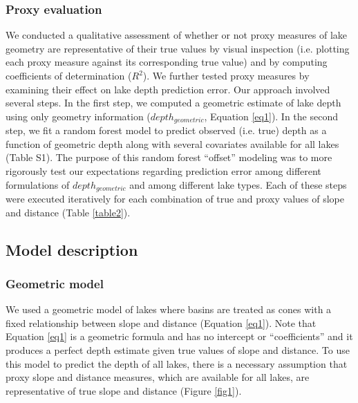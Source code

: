 \documentclass[draft]{agujournal2019}
\begin{document}
\subsubsection{Proxy evaluation}
\noindent
We conducted a qualitative assessment of whether or not proxy measures of lake geometry are representative of their true values by visual inspection (i.e. plotting each proxy measure against its corresponding true value) and by computing coefficients of determination ($R^2$). We further tested proxy measures by examining their effect on lake depth prediction error. Our approach involved several steps. In the first step, we computed a geometric estimate of lake depth using only geometry information ($depth_{geometric}$, Equation \ref{eq1}). In the second step, we fit a random forest model to predict observed (i.e. true) depth as a function of geometric depth along with several covariates available for all lakes (Table S1). The purpose of this random forest “offset” modeling was to more rigorously test our expectations regarding prediction error among different formulations of $depth_{geometric}$ and among different lake types. Each of these steps were executed iteratively for each combination of true and proxy values of slope and distance (Table \ref{table2}).

\subsection{Model description}
\subsubsection{Geometric model}
\noindent
We used a geometric model of lakes where basins are treated as cones with a fixed relationship between slope and distance (Equation \ref{eq1}). Note that Equation \ref{eq1} is a geometric formula and has no intercept or “coefficients” and it produces a perfect depth estimate given true values of slope and distance. To use this model to predict the depth of all lakes, there is a necessary assumption that proxy slope and distance measures, which are available for all lakes, are representative of true slope and distance (Figure \ref{fig1}).
\end{document}

